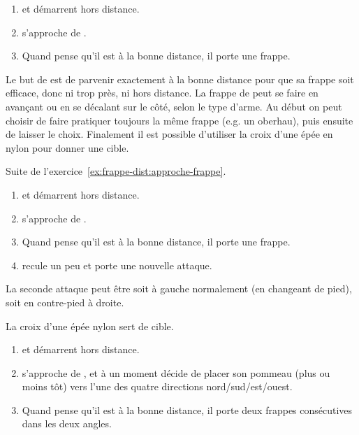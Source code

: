 \begin{exercice}
	\label{ex:frappe-dist:approche-frappe}

	\begin{enumerate}
		\item \A et \D démarrent hors distance.
		\item \D s'approche de \A.
		\item Quand \A pense qu'il est à la bonne distance, il porte une frappe.
	\end{enumerate}

	Le but de \A est de parvenir exactement à la bonne distance pour que sa frappe soit efficace, donc ni trop près, ni hors distance.
	La frappe de \A peut se faire en avançant ou en se décalant sur le côté, selon le type d'arme.
	Au début on peut choisir de faire pratiquer toujours la même frappe (e.g.
	un oberhau), puis ensuite de laisser le choix.
	Finalement il est possible d'utiliser la croix d'une épée en nylon pour donner une cible.
\end{exercice}


\begin{exercice}
	\label{ex:frappe-dist:approche-double-frappe}

	Suite de l'exercice~\ref{ex:frappe-dist:approche-frappe}.

	\begin{enumerate}
		\item \A et \D démarrent hors distance.
		\item \D s'approche de \A.
		\item Quand \A pense qu'il est à la bonne distance, il porte une frappe.
		\item \D recule un peu et \A porte une nouvelle attaque.
	\end{enumerate}

	La seconde attaque peut être soit à gauche normalement (en changeant de pied), soit en contre-pied à droite.
\end{exercice}


\begin{exercice}
	\label{ex:frappe-dist:approche-croix-aleat}

	La croix d'une épée nylon sert de cible.

	\begin{enumerate}
		\item \A et \D démarrent hors distance.
		\item \D s'approche de \A, et à un moment décide de placer son pommeau (plus ou moins tôt) vers l'une des quatre directions nord/sud/est/ouest.
		\item Quand \A pense qu'il est à la bonne distance, il porte deux frappes consécutives dans les deux angles.
	\end{enumerate}

\end{exercice}


